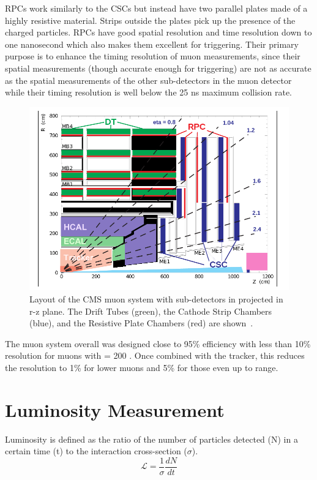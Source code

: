 	RPCs work similarly to the CSCs but instead have two parallel plates made of a highly resistive material. Strips outside the plates pick up the presence of the charged particles. RPCs have good spatial resolution and time resolution down to one nanosecond which also makes them excellent for triggering. Their primary purpose is to enhance the timing resolution of muon measurements, since their spatial measurements (though accurate enough for triggering) are not as accurate as the spatial measurements of the other sub-detectors in the muon detector while their timing resolution is well below the 25 ns maximum collision rate.\\
						\begin{figure}[h]
\begin{center}
\includegraphics[width=0.9\linewidth]{Figs/muon_system.png}
\caption{\label{fig:muonchamber}
Layout of the CMS muon system with sub-detectors in projected in r-z plane. The Drift Tubes (green), the Cathode Strip Chambers (blue), and the Resistive Plate Chambers (red) are shown~\cite{muontdr}.
}
\end{center}
\end{figure}
	
		The muon system overall was designed close to 95\% efficiency with less than 10\% resolution for muons with \pt = 200 \GeV. Once combined with the tracker, this reduces the resolution to 1\% for lower \pt muons and 5\% for those even up to \TeV range.\\
		
		
		
	
	\section{Luminosity Measurement}	
		Luminosity is defined as the ratio of the number of particles detected (N) in a certain time (t) to the interaction cross-section ($\sigma$). 
		\begin{equation}
		\mathcal{L} = \frac{1}{\sigma} \frac{dN}{dt}
		\end{equation}
		
